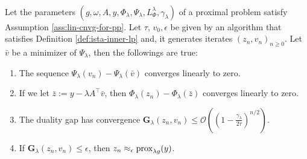 \documentclass[12pt]{article}
\begin{document}
        \begin{proposition}\;\label{prop:inn-loop-lin-cnvg}\\
            Let the parameters $(g, \omega, A, y, \Phi_\lambda, \Psi_\lambda, L^\lambda_{\Phi} ,\gamma_\lambda)$ of a proximal problem satisfy Assumption \ref{ass:lin-cnvg-for-pp}. 
            Let $\tau$, $v_0, \epsilon$ be given by an algorithm that satisfies Definition \ref{def:ista-inner-lp} and, it generates iterates $(z_n, v_n)_{n \ge 0}$. 
            Let $\bar v$ be a minimizer of $\Psi_\lambda$, then the followings are true: 
            \begin{enumerate}[nosep]
                \item The sequence $\Psi_\lambda(v_n) - \Psi_\lambda(\bar v)$ converges linearly to zero. \label{prop:inn-looplin-cnvg-item1}
                \item If we let $\bar z := y - \lambda A^\top \bar v$, then $\Phi_\lambda(z_n) - \Phi_\lambda(\bar z)$ converges linearly to zero. \label{prop:inn-looplin-cnvg-item2}
                \item The duality gap has convergence $\mathbf G_\lambda(z_n, v_n) \le \mathcal O\left(\left(1 - \frac{\gamma_\lambda}{2\tau}\right)^{n/2}\right)$. \label{prop:inn-looplin-cnvg-item3}
                \item If $\mathbf G_\lambda(z_n, v_n) \le \epsilon$, then $z_n \approx_\epsilon \operatorname{prox}_{\lambda g}(y)$. \label{prop:inn-looplin-cnvg-item4}
            \end{enumerate}
        \end{proposition}
\end{document}
